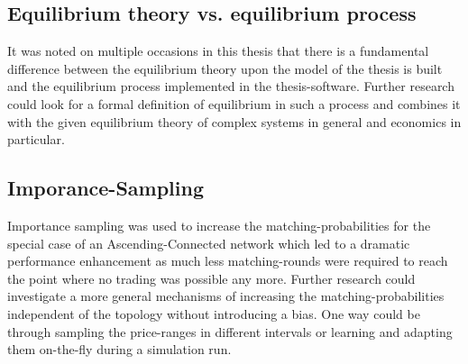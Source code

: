 \documentclass[Bachelorarbeit.tex]{subfiles}
\begin{document}
\subsection{Equilibrium theory vs. equilibrium process}
It was noted on multiple occasions in this thesis that there is a fundamental difference between the equilibrium theory upon the model of the thesis is built and the equilibrium process implemented in the thesis-software. Further research could look for a formal definition of equilibrium in such a process and combines it with the given equilibrium theory of complex systems in general and economics in particular.

\subsection{Imporance-Sampling}
Importance sampling was used to increase the matching-probabilities for the special case of an Ascending-Connected network which led to a dramatic performance enhancement as much less matching-rounds were required to reach the point where no trading was possible any more. Further research could investigate a more general mechanisms of increasing the matching-probabilities independent of the topology without introducing a bias. One way could be through sampling the price-ranges in different intervals or learning and adapting them on-the-fly during a simulation run.
\end{document}
